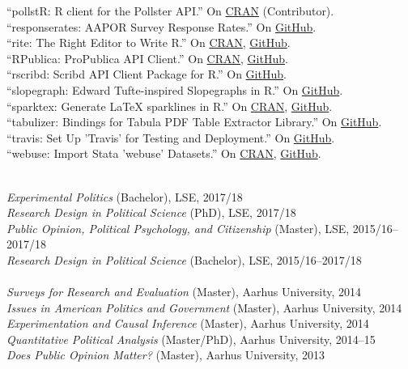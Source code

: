 \documentclass[12pt]{article}
\renewcommand{\section}[1]{\pagebreak[3]%
    \llap{\scshape\smash{\parbox[t]{\marginparwidth}{\raggedright {\color{lg}#1}}}}%
    \vspace{-\baselineskip}\par}
\newcommand{\topic}[1]{\pagebreak[3]\indent {\color{lg}{\footnotesize #1 }}\\}
\newcommand{\entry}[1]{\indent {\color{lg}\guillemotright}\hspace{2pt}#1\vspace{.25em}\\}
\begin{document}
	\entry{``pollstR: R client for the Pollster API.'' On \href{https://cran.r-project.org/package=pollstR}{CRAN} (Contributor).}
	\entry{``responserates: AAPOR Survey Response Rates.'' On \href{https://github.com/leeper/responserates}{GitHub}.}
	\entry{``rite: The Right Editor to Write R.'' On \href{https://cran.r-project.org/package=rite}{CRAN}, \href{https://github.com/leeper/rio}{GitHub}.}
	\entry{``RPublica: ProPublica API Client.'' On \href{https://cran.r-project.org/package=RPublica}{CRAN}, \href{https://github.com/rOpenGov/RPublica}{GitHub}.}
	\entry{``rscribd: Scribd API Client Package for R.'' On \href{https://github.com/cloudyr/rscribd}{GitHub}.}
	\entry{``slopegraph: Edward Tufte-inspired Slopegraphs in R.'' On \href{https://github.com/leeper/slopegraph}{GitHub}.}
	\entry{``sparktex: Generate LaTeX sparklines in R.'' On \href{https://cran.r-project.org/package=sparktex}{CRAN}, \href{https://github.com/leeper/sparktex}{GitHub}.}
	\entry{``tabulizer: Bindings for Tabula PDF Table Extractor Library.'' On \href{https://github.com/ropensci/tabulizer}{GitHub}.}
    \entry{``travis: Set Up 'Travis' for Testing and Deployment.'' On \href{https://github.com/ropenscilabs/travis}{GitHub}.}
	\entry{``webuse: Import Stata 'webuse' Datasets.'' On \href{https://cran.r-project.org/package=webuse}{CRAN}, \href{https://github.com/leeper/webuse}{GitHub}.}
	
\section{Teaching \&\\ Advising}
\topic{Lecturing: London School of Economics and Political Science}
	\entry{\textit{Experimental Politics} (Bachelor), LSE, 2017/18}
	\entry{\textit{Research Design in Political Science} (PhD), LSE, 2017/18}
	\entry{\textit{Public Opinion, Political Psychology, and Citizenship} (Master), LSE, 2015/16--2017/18}
	\entry{\textit{Research Design in Political Science} (Bachelor), LSE, 2015/16--2017/18}

\topic{Lecturing: Aarhus University}
	\entry{\textit{Surveys for Research and Evaluation} (Master), Aarhus University, 2014}
	\entry{\textit{Issues in American Politics and Government} (Master), Aarhus University, 2014}
	\entry{\textit{Experimentation and Causal Inference} (Master), Aarhus University, 2014}
	\entry{\textit{Quantitative Political Analysis} (Master/PhD), Aarhus University, 2014--15}
	\entry{\textit{Does Public Opinion Matter?} (Master), Aarhus University, 2013}
\end{document}
